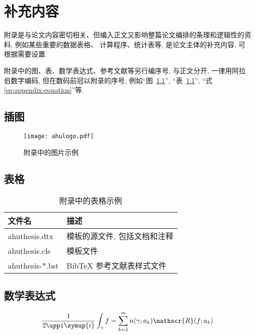 
\chapter{补充内容}

附录是与论文内容密切相关、但编入正文又影响整篇论文编排的条理和逻辑性的资料, 例如某些重要的数据表格、
计算程序、统计表等, 是论文主体的补充内容, 可根据需要设置.

附录中的图、表、数学表达式、参考文献等另行编序号, 与正文分开, 一律用阿拉伯数字编码,
但在数码前冠以附录的序号, 例如“图~\ref{fig:appendix-figure}”,
“表~\ref{tab:appendix-table}”, “式 \eqref{eq:appendix-equation}”等.


\section{插图}

\begin{figure}
  \centering
  \texttt{[image: ahulogo.pdf]}
  \caption{附录中的图片示例}
  \label{fig:appendix-figure}
\end{figure}


\section{表格}

\begin{table}
  \centering
  \caption{附录中的表格示例}
  \begin{tabular}{ll}
    \toprule
    文件名          & 描述                         \\
    \midrule
    ahuthesis.dtx   & 模板的源文件, 包括文档和注释 \\
    ahuthesis.cls   & 模板文件                     \\
    ahuthesis-*.bst & BibTeX 参考文献表样式文件    \\
    \bottomrule
  \end{tabular}
  \label{tab:appendix-table}
\end{table}


\section{数学表达式}

\begin{equation}
  \frac{1}{2 \uppi \symup{i}} \int_\gamma f = \sum_{k=1}^m n(\gamma; a_k) \mathscr{R}(f; a_k)
  \label{eq:appendix-equation}
\end{equation}